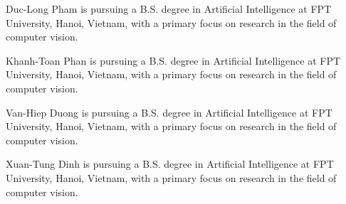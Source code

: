 \documentclass{ieeeaccess}
\begin{document}
\begin{IEEEbiography}{Duc-Long Pham} is pursuing a B.S. degree in Artificial Intelligence at FPT University, Hanoi, Vietnam, with a primary focus on research in the field of computer vision.
\end{IEEEbiography}

\begin{IEEEbiography}{Khanh-Toan Phan} is pursuing a B.S. degree in Artificial Intelligence at FPT University, Hanoi, Vietnam, with a primary focus on research in the field of computer vision.
\end{IEEEbiography}

\begin{IEEEbiography}{Van-Hiep Duong} is pursuing a B.S. degree in Artificial Intelligence at FPT University, Hanoi, Vietnam, with a primary focus on research in the field of computer vision.
\end{IEEEbiography}

\begin{IEEEbiography}{Xuan-Tung Dinh} is pursuing a B.S. degree in Artificial Intelligence at FPT University, Hanoi, Vietnam, with a primary focus on research in the field of computer vision.
\end{IEEEbiography}
\end{document}
